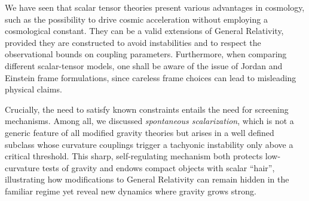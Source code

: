 We have seen that scalar tensor theories present various advantages in cosmology, such as the possibility to drive cosmic acceleration without employing a cosmological constant. They can be a valid extensions of General Relativity, provided they are constructed to avoid instabilities and to respect the observational bounds on coupling parameters. Furthermore, when comparing different scalar-tensor models, one shall be aware of the issue of Jordan and Einstein frame formulations, since careless frame choices can lead to misleading physical claims. 

Crucially, the need to satisfy known constraints entails the need for screening mechanisms. Among all, we discussed \textit{spontaneous scalarization}, which is not a generic feature of all modified gravity theories but arises in a well defined subclass whose curvature couplings trigger a tachyonic instability only above a critical threshold.  This sharp, self-regulating mechanism both protects low-curvature tests of gravity and endows compact objects with scalar “hair”, illustrating how modifications to General Relativity can remain hidden in the familiar regime yet reveal new dynamics where gravity grows strong.